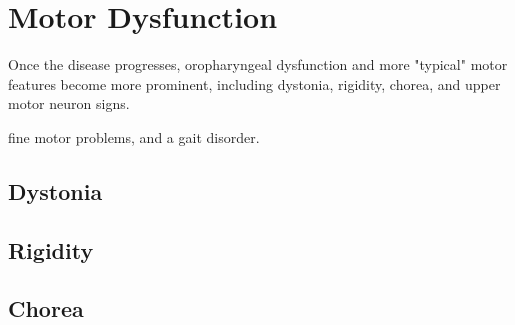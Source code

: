 \chapter{Motor Dysfunction}

Once the disease progresses, oropharyngeal dysfunction
and more "typical" motor features become more
prominent, including dystonia, rigidity, chorea, and
upper motor neuron signs.

fine motor problems, and a gait disorder.

\section{Dystonia}

\section{Rigidity}

\section{Chorea}


